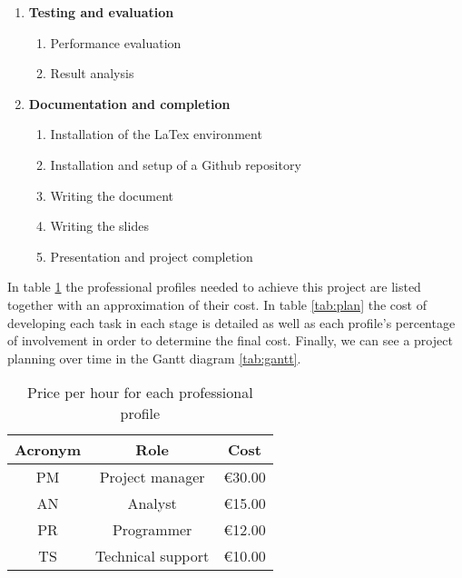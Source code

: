 \begin{enumerate}
\begin{enumerate}
  \end{enumerate}
  \item \textbf{Testing and evaluation}
  \begin{enumerate}
    \item Performance evaluation
    \item Result analysis
  \end{enumerate}
  \item \textbf{Documentation and completion}
  \begin{enumerate}
    \item{Installation of the LaTex environment}
    \item{Installation and setup of a Github repository}
    \item{Writing the document}
    \item{Writing the slides}
    \item{Presentation and project completion} 
  \end{enumerate} 
\end{enumerate}

In table  \ref{tab:prices} the professional profiles needed to achieve this project are listed together with an approximation of their cost. In table \ref{tab:plan} the cost of developing each task in each stage is detailed
as well as each profile's percentage of involvement in order to determine the final cost. Finally, we can see a project planning over time in the Gantt diagram \ref{tab:gantt}.


\begin{table}[htbp]
\caption{Price per hour for each professional profile}
\begin{center}
\begin{tabular}{|c|c|c|}
\hline
\textbf{Acronym} & \textbf{Role} & \textbf{Cost} \\ \hline
PM & Project manager & \textgreek{\euro}30.00 \\ \hline
AN & Analyst & \textgreek{\euro}15.00 \\ \hline
PR & Programmer & \textgreek{\euro}12.00 \\ \hline
TS & Technical support & \textgreek{\euro}10.00 \\ \hline
\end{tabular}
\end{center}
\label{tab:prices}
\end{table}





